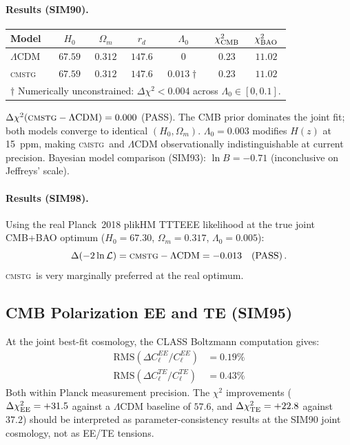 \documentclass[12pt,a4paper]{article}
\newcommand{\CMSTG}{\textsc{cmstg}}
\newcommand{\Lz}{\Lambda_0}
\begin{document}
\paragraph{Results (SIM90).}
\begin{center}
  \setlength{\tabcolsep}{5pt}
  \begin{tabular}{lcccccc}
    \toprule
    Model & $H_0$ & $\Omega_m$ & $r_d$ & $\Lz$ & $\chi^2_{\rm CMB}$ & $\chi^2_{\rm BAO}$ \\
    \midrule
    $\Lambda$CDM & $67.59$ & $0.312$ & $147.6$ & $0$            & $0.23$ & $11.02$ \\
    \CMSTG       & $67.59$ & $0.312$ & $147.6$ & $0.013\dagger$ & $0.23$ & $11.02$ \\
    \bottomrule
    \multicolumn{7}{l}{\footnotesize $\dagger$ Numerically unconstrained: $\Delta\chi^2 < 0.004$ across $\Lz \in [0, 0.1]$.}
  \end{tabular}
\end{center}
$\Delta\chi^2(\CMSTG - \Lambda\mathrm{CDM}) = 0.000$ (PASS). The CMB prior
dominates the joint fit; both models converge to identical $(H_0, \Omega_m)$.
$\Lz = 0.003$ modifies $H(z)$ at 15~ppm, making \CMSTG\ and $\Lambda$CDM
observationally indistinguishable at current precision. Bayesian model
comparison (SIM93): $\ln B = -0.71$ (inconclusive on Jeffreys' scale).

\paragraph{Results (SIM98).} Using the real Planck~2018 plikHM TTTEEE likelihood
at the true joint CMB+BAO optimum ($H_0 = 67.30$, $\Omega_m = 0.317$, $\Lz =
0.005$):
\begin{equation}
  \Delta(-2\ln\mathcal{L}) = \CMSTG - \Lambda\mathrm{CDM} = -0.013 \quad\text{(PASS)}\,.
\end{equation}
\CMSTG\ is very marginally preferred at the real optimum.

\subsection{CMB Polarization EE and TE (SIM95)}
\label{sec:polarization}

At the joint best-fit cosmology, the CLASS Boltzmann computation gives:
\begin{align}
  \mathrm{RMS}(\Delta C_\ell^{EE}/C_\ell^{EE}) &= 0.19\% \nonumber \\
  \mathrm{RMS}(\Delta C_\ell^{TE}/C_\ell^{TE}) &= 0.43\% \nonumber
\end{align}
Both within Planck measurement precision. The $\chi^2$ improvements ($\Delta\chi^2_{\rm EE} =
+31.5$ against a $\Lambda$CDM baseline of $57.6$, and $\Delta\chi^2_{\rm TE} = +22.8$
against $37.2$) should be interpreted as parameter-consistency results at
the SIM90 joint cosmology, not as EE/TE tensions.
\end{document}
